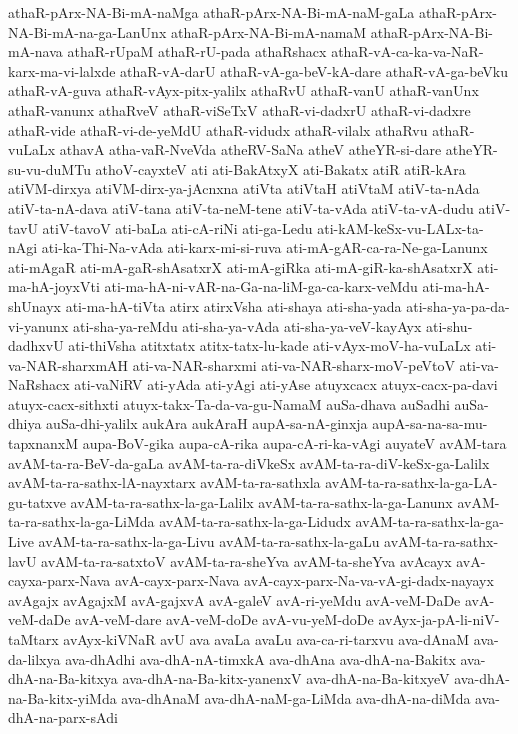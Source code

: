 {athaR-pArx-NA-Bi-mA-naMga
athaR-pArx-NA-Bi-mA-naM-gaLa
athaR-pArx-NA-Bi-mA-na-ga-LanUnx
athaR-pArx-NA-Bi-mA-namaM
athaR-pArx-NA-Bi-mA-nava
athaR-rUpaM
athaR-rU-pada
athaRshacx
athaR-vA-ca-ka-va-NaR-karx-ma-vi-lalxde
athaR-vA-darU
athaR-vA-ga-beV-kA-dare
athaR-vA-ga-beVku
athaR-vA-guva
athaR-vAyx-pitx-yalilx
athaRvU
athaR-vanU
athaR-vanUnx
athaR-vanunx
athaRveV
athaR-viSeTxV
athaR-vi-dadxrU
athaR-vi-dadxre
athaR-vide
athaR-vi-de-yeMdU
athaR-vidudx
athaR-vilalx
athaRvu
athaR-vuLaLx
athavA
atha-vaR-NveVda
atheRV-SaNa
atheV
atheYR-si-dare
atheYR-su-vu-duMTu
athoV-cayxteV
ati
ati-BakAtxyX
ati-Bakatx
atiR
atiR-kAra
atiVM-dirxya
atiVM-dirx-ya-jAcnxna
atiVta
atiVtaH
atiVtaM
atiV-ta-nAda
atiV-ta-nA-dava
atiV-tana
atiV-ta-neM-tene
atiV-ta-vAda
atiV-ta-vA-dudu
atiV-tavU
atiV-tavoV
ati-baLa
ati-cA-riNi
ati-ga-Ledu
ati-kAM-keSx-vu-LALx-ta-nAgi
ati-ka-Thi-Na-vAda
ati-karx-mi-si-ruva
ati-mA-gAR-ca-ra-Ne-ga-Lanunx
ati-mAgaR
ati-mA-gaR-shAsatxrX
ati-mA-giRka
ati-mA-giR-ka-shAsatxrX
ati-ma-hA-joyxVti
ati-ma-hA-ni-vAR-na-Ga-na-liM-ga-ca-karx-veMdu
ati-ma-hA-shUnayx
ati-ma-hA-tiVta
atirx
atirxVsha
ati-shaya
ati-sha-yada
ati-sha-ya-pa-da-vi-yanunx
ati-sha-ya-reMdu
ati-sha-ya-vAda
ati-sha-ya-veV-kayAyx
ati-shu-dadhxvU
ati-thiVsha
atitxtatx
atitx-tatx-lu-kade
ati-vAyx-moV-ha-vuLaLx
ati-va-NAR-sharxmAH
ati-va-NAR-sharxmi
ati-va-NAR-sharx-moV-peVtoV
ati-va-NaRshacx
ati-vaNiRV
ati-yAda
ati-yAgi
ati-yAse
atuyxcacx
atuyx-cacx-pa-davi
atuyx-cacx-sithxti
atuyx-takx-Ta-da-va-gu-NamaM
auSa-dhava
auSadhi
auSa-dhiya
auSa-dhi-yalilx
aukAra
aukAraH
aupA-sa-nA-ginxja
aupA-sa-na-sa-mu-tapxnanxM
aupa-BoV-gika
aupa-cA-rika
aupa-cA-ri-ka-vAgi
auyateV
avAM-tara
avAM-ta-ra-BeV-da-gaLa
avAM-ta-ra-diVkeSx
avAM-ta-ra-diV-keSx-ga-Lalilx
avAM-ta-ra-sathx-lA-nayxtarx
avAM-ta-ra-sathxla
avAM-ta-ra-sathx-la-ga-LA-gu-tatxve
avAM-ta-ra-sathx-la-ga-Lalilx
avAM-ta-ra-sathx-la-ga-Lanunx
avAM-ta-ra-sathx-la-ga-LiMda
avAM-ta-ra-sathx-la-ga-Lidudx
avAM-ta-ra-sathx-la-ga-Live
avAM-ta-ra-sathx-la-ga-Livu
avAM-ta-ra-sathx-la-gaLu
avAM-ta-ra-sathx-lavU
avAM-ta-ra-satxtoV
avAM-ta-ra-sheYva
avAM-ta-sheYva
avAcayx
avA-cayxa-parx-Nava
avA-cayx-parx-Nava
avA-cayx-parx-Na-va-vA-gi-dadx-nayayx
avAgajx
avAgajxM
avA-gajxvA
avA-galeV
avA-ri-yeMdu
avA-veM-DaDe
avA-veM-daDe
avA-veM-dare
avA-veM-doDe
avA-vu-yeM-doDe
avAyx-ja-pA-li-niV-taMtarx
avAyx-kiVNaR
avU
ava
avaLa
avaLu
ava-ca-ri-tarxvu
ava-dAnaM
ava-da-lilxya
ava-dhAdhi
ava-dhA-nA-timxkA
ava-dhAna
ava-dhA-na-Bakitx
ava-dhA-na-Ba-kitxya
ava-dhA-na-Ba-kitx-yanenxV
ava-dhA-na-Ba-kitxyeV
ava-dhA-na-Ba-kitx-yiMda
ava-dhAnaM
ava-dhA-naM-ga-LiMda
ava-dhA-na-diMda
ava-dhA-na-parx-sAdi
}
